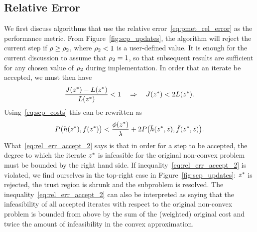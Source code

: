 \documentclass[letterpaper, 10 pt, conference]{ieeeconf}
\begin{document}
\subsection{Relative Error}\label{subsec:creep_rel_err}

We first discuss algorithms that use the relative error~\eqref{eq:pmet_rel_error} as the performance metric. From Figure~\ref{fig:scp_updates}, the algorithm will reject the current step if $\rho\geq\rho_2$, where $\rho_2<1$ is a user-defined value. It is enough for the current discussion to assume that $\rho_2=1$, so that subsequent results are sufficient for any chosen value of $\rho_2$ during implementation. In order that an iterate be accepted, we must then have
\begin{equation}
\frac{J(z^*) - L(z^*)}{L(z^*)} < 1 \quad \Rightarrow \quad  J(z^*) < 2 L(z^*).
\label{eq:rel_err_accept}
\end{equation} 
Using~\eqref{eq:scp_costs} this can be rewritten as
\begin{equation}
P\big( h(z^*),f(z^*) \big) < \frac{\phi(z^*)}{\lambda} + 2 P\big( \bar{h}(z^*,\bar{z}),\bar{f}(z^*,\bar{z}) \big).
\label{eq:rel_err_accept_2}
\end{equation}
What~\eqref{eq:rel_err_accept_2} says is that in order for a step to be accepted, the degree to which the iterate $z^*$ is infeasible for the original non-convex problem must be bounded by the right hand side. If inequality~\eqref{eq:rel_err_accept_2} is violated, we find ourselves in the top-right case in Figure~\ref{fig:scp_updates}: $z^*$ is rejected, the trust region is shrunk and the subproblem is resolved. The inequality~\eqref{eq:rel_err_accept_2} can also be interpreted as saying that the infeasibility of all accepted iterates with respect to the original non-convex problem is bounded from above by the sum of the (weighted) original cost and twice the amount of infeasibility in the convex approximation. 
\end{document}

